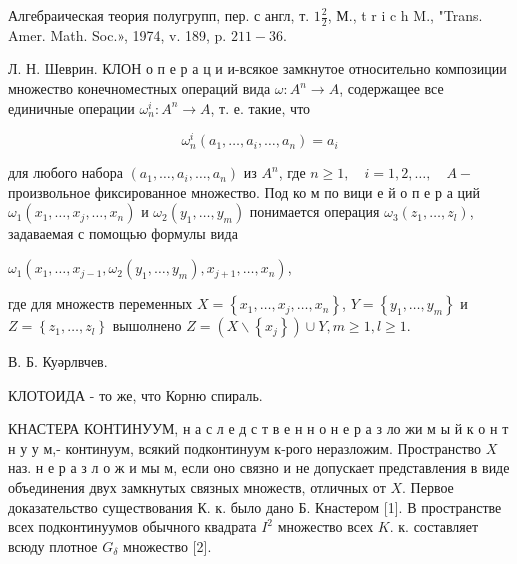 \documentclass[10pt]{article}
\begin{document}
Алгебраическая теория полугрупп, пер. с англ, т. $1 \frac{2}{2}$, М., t r i c h M., "Trans. Amer. Math. Soc.», 1974, v. 189, p. $211-36$.



Л. Н. Шеврин. КЛОН о п е р а ц и и-всякое замкнутое относительно композиции множество конечноместных операций вида $\omega: A^{n} \rightarrow A$, содержащее все единичные операции $\omega_{n}^{i}: A^{n} \rightarrow A$, т. е. такие, что



\[

\omega_{n}^{i}\left(a_{1}, \ldots, a_{i}, \ldots, a_{n}\right)=a_{i}

\]



для любого набора $\left(a_{1}, \ldots, a_{i}, \ldots, a_{n}\right)$ из $A^{n}$, где $n \geqslant 1, \quad i=1,2, \ldots, \quad A-$ произвольное фиксированное множество. Под ко м по вици е й о п е р а ций $\omega_{1}\left(x_{1}, \ldots, x_{j}, \ldots, x_{n}\right)$ и $\omega_{2}\left(y_{1}, \ldots, y_{m}\right)$ понимается операция $\omega_{3}\left(z_{1}, \ldots, z_{l}\right)$, задаваемая с помощью формулы вида



$\omega_{1}\left(x_{1}, \ldots, x_{j-1}, \omega_{2}\left(y_{1}, \ldots, y_{m}\right), x_{j+1}, \ldots, x_{n}\right)$,



где для множеств переменных $X=\left\{x_{1}, \ldots, x_{j}, \ldots, x_{n}\right\}$, $Y=\left\{y_{1}, \ldots, y_{m}\right\}$ и $Z=\left\{z_{1}, \ldots, z_{l}\right\}$ вышолнено $Z=\left(X \backslash\left\{x_{j}\right\}\right) \cup Y, m \geqslant 1, l \geqslant 1$.



В. Б. Куәрлвчев.



КЛОТОИДА - то же, что Корню спираль.



КНАСТЕРА КОНТИНУУМ, н а с л е д с т в е н н о н е р а $з$ ло жи м ы й к о н т н у у м,- континуум, всякий подконтинуум к-рого неразложим. Пространство $X$ наз. н е р а з л о ж и мы м, если оно связно и не допускает представления в виде объединения двух замкнутых связных множеств, отличных от $X$. Первое доказательство существования К. к. было дано Б. Кнастером [1]. В пространстве всех подконтинуумов обычного квадрата $I^{2}$ множество всех $K$. к. составляет всюду плотное $G_{\delta}$ множество [2].
\end{document}
